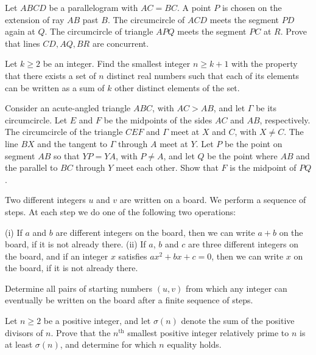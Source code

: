 \documentclass[11pt]{scrartcl}
\begin{document}
\begin{problem}[4389998719836463980]
Let $ABCD$ be a parallelogram with $AC=BC.$ A point $P$ is chosen on the extension of ray $AB$ past $B.$ The circumcircle of $ACD$ meets the segment $PD$ again at $Q.$ The circumcircle of triangle $APQ$ meets the segment $PC$ at $R.$ Prove that lines $CD,AQ,BR$ are concurrent.
\end{problem}
\begin{problem}[1837105952530316058]
Let $k\ge2$ be an integer. Find the smallest integer $n \ge k+1$ with the property that there exists a set of $n$ distinct real numbers such that each of its elements can be written as a sum of $k$ other distinct elements of the set.
\end{problem}
\begin{problem}[7351162576557167474]
Consider an acute-angled triangle $ABC$, with $AC>AB$, and let $\Gamma$ be its circumcircle. Let $E$ and $F$ be the midpoints of the sides $AC$ and $AB$, respectively. The circumcircle of the triangle $CEF$ and $\Gamma$ meet at $X$ and $C$, with $X\neq C$. The line $BX$ and the tangent to $\Gamma$ through $A$ meet at $Y$. Let $P$ be the point on segment $AB$ so that $YP = YA$, with $P\neq A$, and let $Q$ be the point where $AB$ and the parallel to $BC$ through $Y$ meet each other. Show that $F$ is the midpoint of $PQ$.
\end{problem}
\begin{problem}[7710975676761169567]
Two different integers $u$ and $v$ are written on a board. We perform a sequence of steps. At each step we do one of the following two operations:

(i) If $a$ and $b$ are different integers on the board, then we can write $a + b$ on the board, if it is not
already there.
(ii) If $a$, $b$ and $c$ are three different integers on the board, and if an integer $x$ satisfies $ax^2 +bx+c = 0$,
then we can write $x$ on the board, if it is not already there.

Determine all pairs of starting numbers $(u, v)$ from which any integer can eventually be written on the board after a finite sequence of steps.
\end{problem}
\begin{problem}[3458270318471332488]
	Let $n \ge 2$ be a positive integer, and let $\sigma(n)$ denote the sum of the positive divisors of $n$. Prove that the $n^{\text{th}}$ smallest positive integer relatively prime to $n$ is at least $\sigma(n)$, and determine for which $n$ equality holds.
\end{problem}
\end{document}
